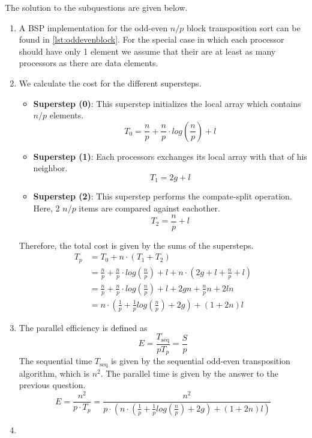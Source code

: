 \documentclass[../main.tex]{subfiles}
\begin{document}
\begin{solution} The solution to the subquestions are given below.
\begin{enumerate}
	\item A BSP implementation for the odd-even $n/p$ block transposition sort can be found in \autoref{lst:oddevenblock}. For the special case in which each processor should have only 1 element we assume that their are at least as many processors as there are data elements.
		
	\item We calculate the cost for the different supersteps.
	\begin{itemize}
		\item \textbf{Superstep (0)}: This superstep initializes the local array which contains $n/p$ elements.
		\begin{equation}
			T_0 = \frac{n}{p} + \frac{n}{p} \cdot log(\frac{n}{p}) + l
		\end{equation}
		\item \textbf{Superstep (1)}: Each processors exchanges its local array with that of his neighbor.
		\begin{equation}
			T_1 = 2 g + l
		\end{equation}
		\item \textbf{Superstep (2)}: This superstep performs the compate-split operation. Here, 2 $n/p$ items are compared against eachother.
		\begin{equation}
			T_2 = \frac{n}{p} + l
		\end{equation}
	\end{itemize}
	Therefore, the total cost is given by the sums of the supersteps.
	\begin{equation}
		\begin{split}
			T_p & = T_0 + n \cdot (T_1 + T_2) \\
				& = \frac{n}{p} + \frac{n}{p} \cdot log(\frac{n}{p}) +l + n \cdot (2 g + l + \frac{n}{p} + l) \\
				& = \frac{n}{p} + \frac{n}{p} \cdot log(\frac{n}{p}) +l + 2gn + \frac{n}{p}n + 2ln \\
				& = n \cdot \left( \frac{1}{p} + \frac{1}{p} log(\frac{n}{p}) + 2g \right) + \left( 1 + 2n \right) l
		\end{split}
	\end{equation}
	\item The parallel efficiency is defined as
	\begin{equation}
		E = \frac{T_\text{seq}}{p T_p} = \frac{S}{p}
	\end{equation}
	The sequential time $T_\text{seq}$ is given by the sequential odd-even transposition algorithm, which is $n^2$. The parallel time is given by the answer to the previous question.
	\begin{equation}
		E = \frac{n^2}{p \cdot T_p} = \frac{n^2}{p \cdot \left( n \cdot \left( \frac{1}{p} + \frac{1}{p} log(\frac{n}{p}) + 2g \right) + \left( 1 + 2n \right) l \right) } 
	\end{equation}
	\item
\end{enumerate}
\end{solution}
\end{document}
